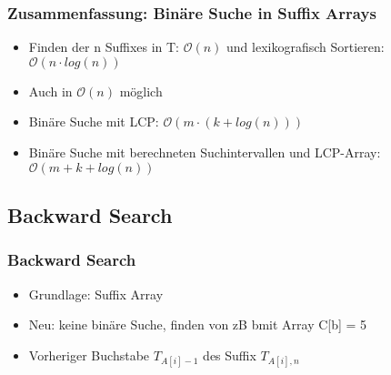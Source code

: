 \documentclass{beamer}
\begin{document}
\begin{frame}
\frametitle{Zusammenfassung: Binäre Suche in Suffix Arrays}
\begin{itemize}
\item Finden der n Suffixes in T: $\mathcal{O}(n)$ und lexikografisch Sortieren: $\mathcal{O}(n\cdot log (n))$
\item Auch in $\mathcal{O}(n)$ möglich
\item Binäre Suche mit LCP: $\mathcal{O}(m\cdot (k + log(n)))$
\item Binäre Suche mit berechneten Suchintervallen und LCP-Array: $\mathcal{O}(m + k + log(n))$
\end{itemize}
\end{frame}
\subsection{Backward Search}
\begin{frame}
\frametitle{Backward Search}
\begin{itemize}
\item Grundlage: Suffix Array
\item Neu: keine binäre Suche, finden von zB \glqq b\grqq mit Array C[\glqq b\grqq ] = 5
\item Vorheriger Buchstabe $T_{A[i]-1}$ des Suffix $T_{A[i],n}$
\end{itemize}
\end{frame}
\end{document}
